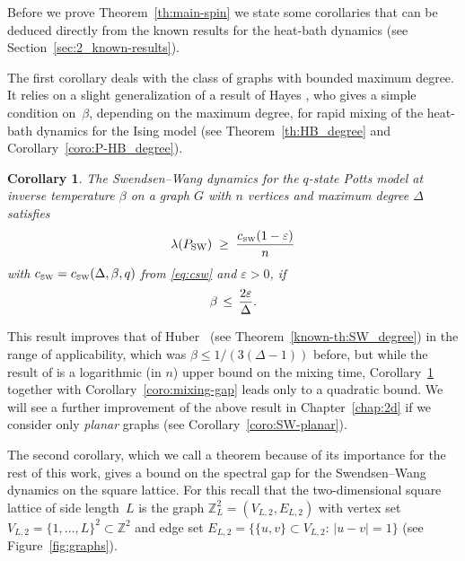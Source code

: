 \documentclass{dis}
\newtheorem{corollary}[theorem]{Corollary}
\theoremstyle{citing}
\begin{document}
Before we prove Theorem~\ref{th:main-spin} we state some corollaries 
that can be deduced directly from the known results for the 
heat-bath dynamics (see Section~\ref{sec:2_known-results}).

The first corollary deals with the class of graphs with bounded 
maximum degree. It relies on a slight generalization of a result 
of Hayes \cite{Ha}, who gives a simple condition on~$\beta$, 
depending on the maximum degree, for rapid mixing 
of the heat-bath dynamics for the Ising model (see 
Theorem~\ref{th:HB_degree} and Corollary~\ref{coro:P-HB_degree}). 

\begin{corollary} \label{coro:SW_degree}
The Swendsen--Wang dynamics for the $q$-state Potts model  
at inverse temperature $\beta$ on a graph $G$ with $n$ vertices 
and maximum degree ${\Delta}$ satisfies
\[
\lambda({P_{\rm SW}})\;\ge\;\frac{{c_{\text{\rm\tiny SW}}}(1-{\varepsilon})}{n}
\] 
with ${c_{\text{\rm\tiny SW}}}={c_{\text{\rm\tiny SW}}}({\Delta},\beta,q)$ from \eqref{eq:csw} and ${\varepsilon}>0$, if
\[
\beta \,\le\, \frac{2{\varepsilon}}{\Delta}.
\vspace{2mm}
\]
\end{corollary}

This result improves that of Huber~\cite{Hu} 
(see Theorem~\ref{known-th:SW_degree}) in the range of 
applicability, which was $\beta\le1/(3({\Delta}-1))$ before, but while 
the result of \cite{Hu} is a logarithmic (in $n$) upper bound on 
the mixing time, Corollary~\ref{coro:SW_degree} together with 
Corollary~\ref{coro:mixing-gap} leads only to a quadratic bound.
We will see a further 
improvement of the above result in Chapter~\ref{chap:2d} 
if we consider only \emph{planar} graphs  
(see Corollary~\ref{coro:SW-planar}).

The second corollary, which we call a theorem because of its 
importance for the rest of this work, 
gives a bound on the spectral gap for 
the Swendsen--Wang dynamics on the square lattice. 
For this recall that the two-dimensional square lattice 
of side length~$L$ is the graph ${\ensuremath{\mathbb{Z}}}^2_L=(V_{L,2},E_{L,2})$ 
with vertex set $V_{L,2}=\{1,\dots,L\}^2\subset{\ensuremath{\mathbb{Z}}}^2$ and 
edge set $E_{L,2}=\bigl\{\{u,v\}\subset V_{L,2}:\,{\left\vert {u-v} \right\vert}=1\bigr\}$  
(see Figure~\ref{fig:graphs}).
\end{document}
